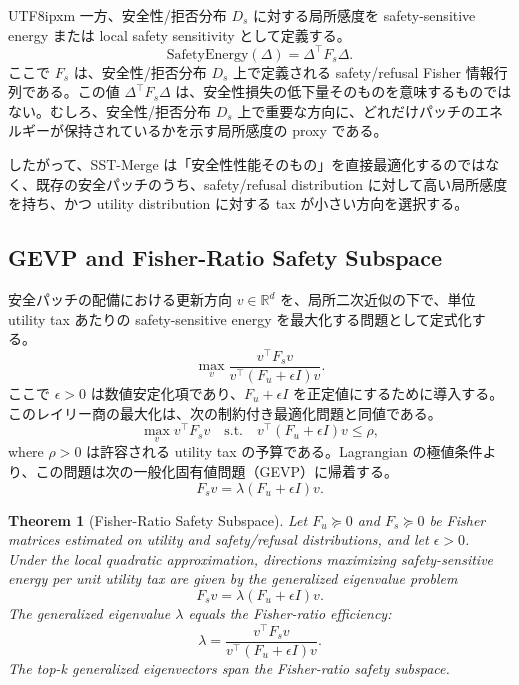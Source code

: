 \documentclass[letterpaper]{article} %
\begin{document}
\begin{CJK*}{UTF8}{ipxm}
一方、安全性/拒否分布 $D_s$ に対する局所感度を safety-sensitive energy または local safety sensitivity として定義する。
\begin{equation}
\mathrm{SafetyEnergy}(\Delta) = \Delta^\top F_s \Delta.
\end{equation}
ここで $F_s$ は、安全性/拒否分布 $D_s$ 上で定義される safety/refusal Fisher 情報行列である。この値 $\Delta^\top F_s \Delta$ は、安全性損失の低下量そのものを意味するものではない。むしろ、安全性/拒否分布 $D_s$ 上で重要な方向に、どれだけパッチのエネルギーが保持されているかを示す局所感度の proxy である。

したがって、SST-Merge は「安全性性能そのもの」を直接最適化するのではなく、既存の安全パッチのうち、safety/refusal distribution に対して高い局所感度を持ち、かつ utility distribution に対する tax が小さい方向を選択する。

\subsection{GEVP and Fisher-Ratio Safety Subspace}
安全パッチの配備における更新方向 $v \in \mathbb{R}^d$ を、局所二次近似の下で、単位 utility tax あたりの safety-sensitive energy を最大化する問題として定式化する。
\begin{equation}
\max_v \frac{v^\top F_s v}{v^\top (F_u + \epsilon I)v}.
\end{equation}
ここで $\epsilon > 0$ は数値安定化項であり、$F_u+\epsilon I$ を正定値にするために導入する。このレイリー商の最大化は、次の制約付き最適化問題と同値である。
\begin{equation}
\max_v v^\top F_s v \quad \text{s.t.} \quad v^\top (F_u + \epsilon I)v \leq \rho,
\end{equation}
where $\rho > 0$ は許容される utility tax の予算である。Lagrangian の極値条件より、この問題は次の一般化固有値問題（GEVP）に帰着する。
\begin{equation}
F_s v = \lambda (F_u + \epsilon I)v.
\end{equation}

\newtheorem{theorem}{Theorem}
\begin{theorem}[Fisher-Ratio Safety Subspace]
Let $F_u \succeq 0$ and $F_s \succeq 0$ be Fisher matrices estimated on utility and safety/refusal distributions, and let $\epsilon > 0$. Under the local quadratic approximation, directions maximizing safety-sensitive energy per unit utility tax are given by the generalized eigenvalue problem
\begin{equation}
F_s v = \lambda (F_u+\epsilon I)v.
\end{equation}
The generalized eigenvalue $\lambda$ equals the Fisher-ratio efficiency:
\begin{equation}
\lambda = \frac{v^\top F_s v}{v^\top (F_u+\epsilon I)v}.
\end{equation}
The top-k generalized eigenvectors span the Fisher-ratio safety subspace.
\end{theorem}


\end{CJK*}
\end{document}
